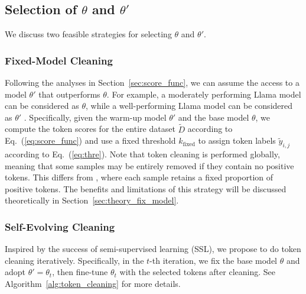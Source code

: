 \subsection{Selection of $\theta$ and $\theta'$}\label{sec_selection_theta}

We discuss two feasible strategies for selecting $\theta$ and $\theta'$.

\subsubsection{Fixed-Model Cleaning}\label{sec:fix-model-cleaning}

Following the analyses in Section~\ref{sec:score_func}, we can assume the access to a model $\theta'$ that outperforms $\theta$. For example, a moderately performing Llama model can be considered as $\theta$, while a well-performing Llama model can be considered as $\theta'$ \cite{mindermann2022prioritized,linnot}.
Specifically, given the warm-up model $\theta'$ and the base model $\theta$, we compute the token scores for the entire dataset $\widetilde{D}$ according to Eq.~(\ref{eq:score_func}) and use a fixed threshold $k_{\text{fixed}}$ to assign token labels $\tilde{y}_{i,j}$ according to Eq.~(\ref{eq:thre}).
Note that token cleaning is performed globally, meaning that some samples may be entirely removed if they contain no positive tokens. This differs from \citet{linnot}, where each sample retains a fixed proportion of positive tokens.
The benefits and limitations of this strategy will be discussed theoretically in Section~\ref{sec:theory_fix_model}.


\subsubsection{Self-Evolving Cleaning}\label{sec:self-evolving-cleaning}

Inspired by the success of semi-supervised learning (SSL), we propose to do token cleaning iteratively. Specifically, in the $t$-th iteration, we fix the base model $\theta$ and adopt $\theta' = \theta_t$, then fine-tune $\theta_{t}$ with the selected tokens after cleaning.
See Algorithm~\ref{alg:token_cleaning} for more details.



